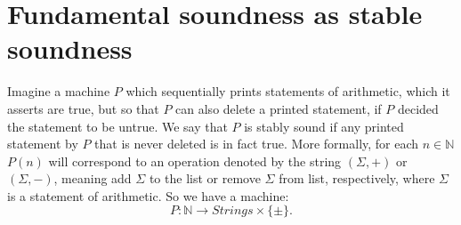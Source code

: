 \documentclass{amsart}  %
\numberwithin{equation}{section}
\newtheorem{theorem}[equation]{Theorem}
\theoremstyle{definition}
\theoremstyle{remark}
\begin{document}
{%
%
\section {Fundamental soundness as stable soundness} \label{section:fundamentalSoundness}
Imagine a machine $P$ which sequentially prints statements of arithmetic, which it asserts are true, but so that $P$ can also delete a printed statement, if $P$ decided the statement to be untrue. We say that $P$ is stably sound if any printed statement by $P$ that is never deleted is in fact true.  More formally, for each $n \in \mathbb{N}$ $P (n)$ will correspond to an operation denoted by the string $(\Sigma,+)$ or $(\Sigma,-)$, meaning add $\Sigma$ to the list or remove $\Sigma$ from list, respectively, where $\Sigma$ is a statement of arithmetic. 
So we have a machine:
\begin{equation*}
P: \mathbb{N} \to Strings \times \{\pm\}.
\end{equation*}

}
\end{document}
